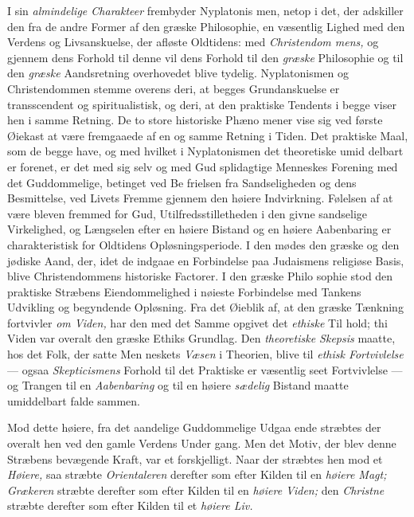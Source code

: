 I sin \emph{almindelige Charakteer} frembyder Nyplatonis\-%
men, netop i det, der adskiller den fra de andre Former af
den græske Philosophie, en væsentlig Lighed med den Verdens\-%
og Livsanskuelse, der afløste Oldtidens: med \emph{Christendom\-%
mens,} og gjennem dens Forhold til denne vil dens Forhold
til den \emph{græske} Philosophie og til den \emph{græske} Aandsretning
overhovedet blive tydelig. Nyplatonismen og Christendommen
stemme overens deri, at begges Grundanskuelse er transscendent
og spiritualistisk, og deri, at den praktiske Tendents i begge
viser hen i samme Retning. De to store historiske Phæno\-%
mener vise sig ved første Øiekast at være fremgaaede af en
og samme Retning i Tiden. Det praktiske Maal, som de begge
have, og med hvilket i Nyplatonismen det theoretiske umid\-%
delbart er forenet, er det med sig selv og med Gud splidagtige
Menneskes Forening med det Guddommelige, betinget ved Be\-%
frielsen fra Sandseligheden og dens Besmittelse, ved Livets
Fremme gjennem den høiere Indvirkning. Følelsen af at være
bleven fremmed for Gud, Utilfredsstilletheden i den givne sandselige
Virkelighed, og Længselen efter en høiere Bistand og en høiere
Aabenbaring er charakteristisk for Oldtidens Opløsningsperiode.
I den mødes den græske og den jødiske Aand, der, idet de
indgaae en Forbindelse paa Judaismens religiøse Basis, blive
Christendommens historiske Factorer. I den græske Philo\-%
sophie stod den praktiske Stræbens Eiendommelighed i nøieste
Forbindelse med Tankens Udvikling og begyndende Opløsning.
Fra det Øieblik af, at den græske Tænkning fortvivler \emph{om
Viden,} har den med det Samme opgivet det \emph{ethiske} Til\-%
hold; thi Viden var overalt den græske Ethiks Grundlag. Den
\emph{theoretiske Skepsis} maatte, hos det Folk, der satte Men\-%
neskets \emph{Væsen} i Theorien, blive til \emph{ethisk Fortvivlelse} ---
ogsaa \emph{Skepticismens} Forhold til det Praktiske er væsentlig
seet Fortvivlelse --- og Trangen til en \emph{Aabenbaring} og til
en høiere \emph{sædelig} Bistand maatte umiddelbart falde sammen.

Mod dette høiere, fra det aandelige Guddommelige Udgaa\-%
ende stræbtes der overalt hen ved den gamle Verdens Under\-%
gang. Men det Motiv, der blev denne Stræbens bevægende
Kraft, var et forskjelligt. Naar der stræbtes hen mod et
\emph{Høiere,} saa stræbte \emph{Orientaleren} derefter som efter Kilden
til en \emph{høiere Magt;} \emph{Grækeren} stræbte derefter som efter
Kilden til en \emph{høiere Viden;} den \emph{Christne} stræbte derefter
som efter Kilden til et \emph{høiere Liv.}

